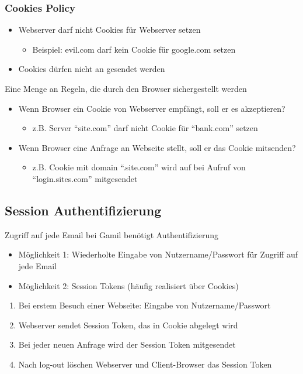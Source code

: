 \subsubsection*{Cookies Policy}
\begin{itemize}
    \item Webserver darf nicht Cookies für  Webserver setzen
    \begin{itemize}
        \item Beispiel: evil.com darf kein Cookie für google.com setzen
    \end{itemize}
    \item Cookies dürfen nicht an  gesendet werden
\end{itemize}
 Eine Menge an Regeln, die durch den Browser sichergestellt werden
\begin{itemize}
    \item Wenn Browser ein Cookie von Webserver empfängt, soll er es akzeptieren?
    \begin{itemize}
        \item z.B. Server \enquote{site.com} darf nicht Cookie für \enquote{bank.com} setzen
    \end{itemize}
    \item Wenn Browser eine Anfrage an Webseite stellt, soll er das Cookie mitsenden?
    \begin{itemize}
        \item z.B. Cookie mit domain \enquote{.site.com} wird auf bei Aufruf von \enquote{login.sites.com} mitgesendet
    \end{itemize}
\end{itemize}
\subsection{Session Authentifizierung}
 Zugriff auf jede Email bei Gamil benötigt Authentifizierung
\begin{itemize}
    \item Möglichkeit 1: Wiederholte Eingabe von Nutzername/Passwort für Zugriff auf jede Email
    \item Möglichkeit 2: Session Tokens (häufig realisiert über Cookies)
\end{itemize}
\begin{enumerate}
    \item Bei erstem Besuch einer Webseite: Eingabe von Nutzername/Passwort
    \item Webserver sendet Session Token, das in Cookie abgelegt wird
    \item Bei jeder neuen Anfrage wird der Session Token mitgesendet
    \item Nach log-out löschen Webserver und Client-Browser das Session Token
\end{enumerate}
